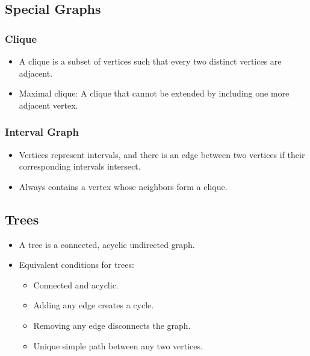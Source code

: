 \documentclass[10pt]{article}
\begin{document}
\subsection{Special Graphs}
\subsubsection{Clique}
\begin{itemize}
    \item A clique is a subset of vertices such that every two distinct vertices are adjacent.
    \item Maximal clique: A clique that cannot be extended by including one more adjacent vertex.
\end{itemize}

\subsubsection{Interval Graph}
\begin{itemize}
    \item Vertices represent intervals, and there is an edge between two vertices if their corresponding intervals intersect.
    \item Always contains a vertex whose neighbors form a clique.
\end{itemize}

\subsection{Trees}
\begin{itemize}
    \item A tree is a connected, acyclic undirected graph.
    \item Equivalent conditions for trees:
    \begin{itemize}
        \item Connected and acyclic.
        \item Adding any edge creates a cycle.
        \item Removing any edge disconnects the graph.
        \item Unique simple path between any two vertices.
    \end{itemize}
\end{itemize}
\end{document}
